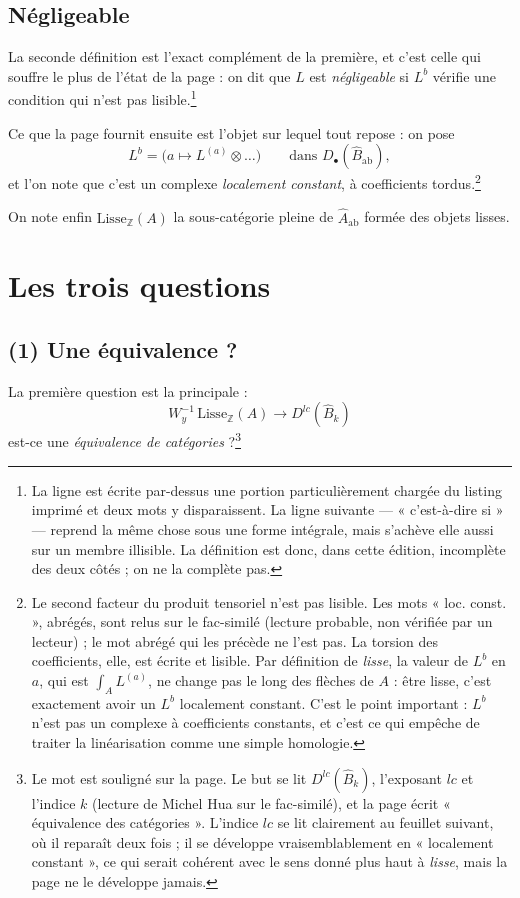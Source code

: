 \documentclass[11pt,a4paper]{article}
\begin{document}
\subsection*{Négligeable}

La seconde définition est l'exact complément de la première, et c'est celle qui
souffre le plus de l'état de la page : on dit que $L$ est \emph{négligeable} si
$L^{b}$ vérifie une condition qui n'est pas lisible.\footnote{La ligne est
écrite par-dessus une portion particulièrement chargée du listing imprimé et
deux mots y disparaissent. La ligne suivante --- « c'est-à-dire si » --- reprend
la même chose sous une forme intégrale, mais s'achève elle aussi sur un membre
illisible. La définition est donc, dans cette édition, incomplète des deux
côtés ; on ne la complète pas.}

Ce que la page fournit ensuite est l'objet sur lequel tout repose : on pose
\[
L^{b} = \bigl(a \mapsto L^{(a)} \otimes \ldots \bigr)
\qquad\text{dans } D_{\bullet}(\hat{B}_{\mathrm{ab}}),
\]
et l'on note que c'est un complexe \emph{localement constant}, à coefficients
tordus.\footnote{Le second facteur du produit tensoriel n'est pas lisible. Les
mots « loc. const. », abrégés, sont relus sur le fac-similé (lecture probable,
non vérifiée par un lecteur) ; le mot abrégé qui les précède ne l'est pas. La
torsion des coefficients, elle, est écrite et lisible. Par définition de
\emph{lisse}, la valeur de $L^{b}$ en $a$, qui est $\int_{A} L^{(a)}$, ne change
pas le long des flèches de $A$ : être lisse, c'est exactement avoir un $L^{b}$
localement constant. C'est le point important : $L^{b}$ n'est pas un
complexe à coefficients constants, et c'est ce qui empêche de traiter la
linéarisation comme une simple homologie.}

On note enfin $\mathrm{Lisse}_{\mathbb{Z}}(A)$ la sous-catégorie pleine de
$\hat{A}_{\mathrm{ab}}$ formée des objets lisses.

\section*{Les trois questions}

\subsection*{(1) Une équivalence ?}

La première question est la principale :
\[
W_{y}^{-1}\,\mathrm{Lisse}_{\mathbb{Z}}(A) \longrightarrow
D^{lc}(\hat{B}_{k})
\]
est-ce une \emph{équivalence de catégories} ?\footnote{Le mot est souligné sur
la page. Le but se lit $D^{lc}(\hat{B}_{k})$, l'exposant $lc$ et l'indice $k$
(lecture de Michel Hua sur le fac-similé), et la page écrit « équivalence
des catégories ». L'indice $lc$ se lit clairement au feuillet suivant, où il reparaît
deux fois ; il se développe vraisemblablement en « localement constant », ce qui
serait cohérent avec le sens donné plus haut à \emph{lisse}, mais la page ne le
développe jamais.}
\end{document}
